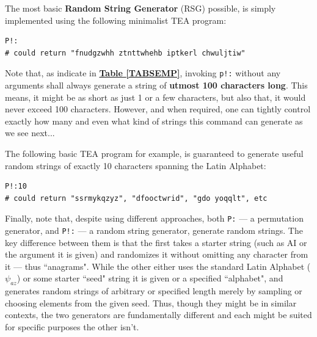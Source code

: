 \documentclass[a4paper, 18pt]{book} %
\begin{document}
{{\vspace{2em}

The most basic \textbf{Random String Generator} (RSG) possible, is simply implemented using the following minimalist TEA program:


\vspace{2em}

  \begin{tcolorbox}[teaterminalstyle, title=P: EXAMPLE 2: Most Basic Random String Generator in TEA, breakable]
  \begin{lstlisting}[language=TEA,breaklines=true,]
P!:
# could return "fnudgzwhh ztnttwhehb iptkerl chwuljtiw"
   \end{lstlisting}
  \end{tcolorbox}

\vspace{2em}

Note that, as indicate in \textbf{\hyperref[TABSEMP]{Table \ref{TABSEMP}}}, invoking \texttt{p!:} without any arguments shall always generate a string of \textbf{utmost 100 characters long}. This means, it might be as short as just 1 or a few characters, but also that, it would never exceed 100 characters. However, and when required, one can tightly control exactly how many and even what kind of strings this command can generate as we see next...

\vspace{2em}

The following basic TEA program for example, is guaranteed to generate useful random strings of exactly 10 characters spanning the Latin Alphabet:


\vspace{2em}

  \begin{tcolorbox}[teaterminalstyle, title=P: EXAMPLE 3: A Constrained RSG in TEA, breakable]
  \begin{lstlisting}[language=TEA,breaklines=true,]
P!:10
# could return "ssrmykqzyz", "dfooctwrid", "gdo yoqqlt", etc
   \end{lstlisting}
  \end{tcolorbox}

\vspace{2em}

Finally, note that, despite using different approaches, both \texttt{P:} --- a permutation generator, and \texttt{P!:} --- a random string generator, generate random strings. The key difference between them is that the first takes a starter string (such as AI or the argument it is given) and randomizes it without omitting any character from it --- thus ``anagrams". While the other either uses the standard Latin Alphabet ($\psi_{az}$) or some starter ``seed" string it is given or a specified ``alphabet", and generates random strings of arbitrary or specified length merely by sampling or choosing elements from the given seed. Thus, though they might be in similar contexts, the two generators are fundamentally different and each might be suited for specific purposes the other isn't.


}}
\end{document}
